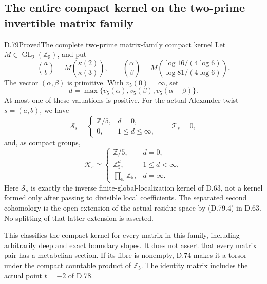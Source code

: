 \subsection{The entire compact kernel on the two-prime invertible matrix family}

\begin{statement}{D.79}{Proved}{The complete two-prime matrix-family compact kernel}
Let \(M\in\operatorname{GL}_2(\mathbb Z_5)\), and put
\[
 \binom ab=M\binom{\kappa(2)}{\kappa(3)},\qquad
 \binom\alpha\beta
 =M\binom{\log16/(4\log6)}{\log81/(4\log6)}.
                                                               \tag{D.79.1}
\]
The vector \((\alpha,\beta)\) is primitive. With
\(v_5(0)=\infty\), set
\[
 d=\max\{v_5(\alpha),v_5(\beta),v_5(\alpha-\beta)\}.
                                                               \tag{D.79.2}
\]
At most one of these valuations is positive. For the actual
Alexander twist \(s=(a,b)\), we have
\[
 \mathcal S_s=
 \begin{cases}
  \mathbb Z/5,&d=0,\\
  0,&1\le d\le\infty,
 \end{cases}
 \qquad \mathcal T_s=0,
                                                               \tag{D.79.3}
\]
and, as compact groups,
\[
 \mathcal K_s\simeq
 \begin{cases}
  \mathbb Z/5,&d=0,\\
  \mathbb Z_5^d,&1\le d<\infty,\\
  \displaystyle\prod_{\mathbb N}\mathbb Z_5,&d=\infty.
 \end{cases}                                                   \tag{D.79.4}
\]
Here \(\mathcal S_s\) is exactly the inverse finite-global-localization
kernel of D.63, not a kernel formed only after passing to divisible
local coefficients. The separated second cohomology is the open
extension of the actual residue space by (D.79.4) in D.63.
No splitting of that latter extension is asserted.

This classifies the compact kernel for every matrix in this family,
including arbitrarily deep and exact boundary slopes. It does not
assert that every matrix pair has a metabelian section. If its fibre
is nonempty, D.74 makes it a torsor under the compact countable
product of \(\mathbb Z_5\). The identity matrix includes the actual
point \(t=-2\) of D.78.
\end{statement}

